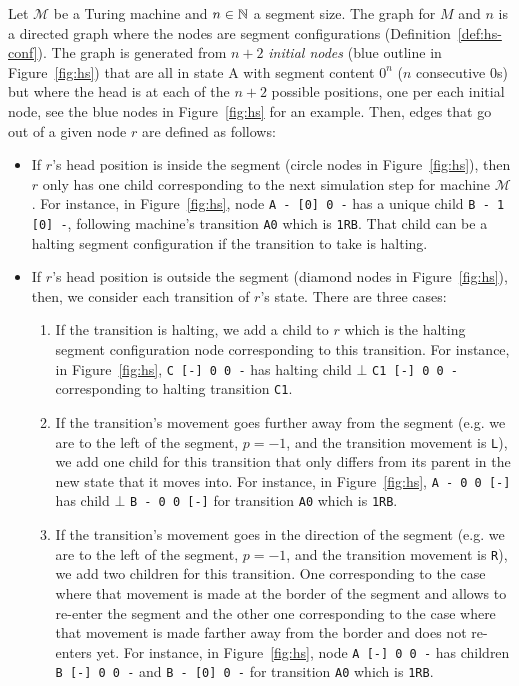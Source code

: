 \begin{definition}[\HS graph]\label{def:hs-graph}
  Let $\mathcal{M}$ be a Turing machine and $n \in \mathbb{N}$ a segment size. The \HS graph for $M$ and $n$ is a directed graph where the nodes are segment configurations (Definition~\ref{def:hs-conf}). The graph is generated from $n+2$ \textit{initial nodes} (blue outline in Figure~\ref{fig:hs}) that are all in state A with segment content $0^n$ ($n$ consecutive 0s) but where the head is at each of the $n+2$ possible positions, one per each initial node, see the blue nodes in Figure~\ref{fig:hs} for an example.
  Then, edges that go out of a given node $r$ are defined as follows:
  \begin{itemize}
    \item If $r$'s head position is inside the segment (circle nodes in Figure~\ref{fig:hs}), then $r$ only has one child corresponding to the next simulation step for machine $\mathcal{M}$. For instance, in Figure~\ref{fig:hs}, node \texttt{A - [0] 0 -} has a unique child \texttt{B - 1 [0] -}, following machine's transition \texttt{A0} which is \texttt{1RB}. That child can be a halting segment configuration if the transition to take is halting.
    \item If $r$'s head position is outside the segment (diamond nodes in Figure~\ref{fig:hs}), then, we consider each transition of $r$'s state. There are three cases:
          \begin{enumerate}
            \item If the transition is halting, we add a child to $r$ which is the halting segment configuration node corresponding to this transition. For instance, in Figure~\ref{fig:hs}, \texttt{C [-] 0 0 -} has halting child $\bot$ \texttt{C1 [-] 0 0 -} corresponding to halting transition \texttt{C1}.
            \item If the transition's movement goes further away from the segment (e.g. we are to the left of the segment, $p=-1$, and the transition movement is \texttt{L}), we add one child for this transition that only differs from its parent in the new state that it moves into. For instance, in Figure~\ref{fig:hs}, \texttt{A - 0 0 [-]} has child $\bot$ \texttt{B - 0 0 [-]} for transition \texttt{A0} which is \texttt{1RB}.
            \item If the transition's movement goes in the direction of the segment (e.g. we are to the left of the segment, $p=-1$, and the transition movement is \texttt{R}), we add two children for this transition. One corresponding to the case where that movement is made at the border of the segment and allows to re-enter the segment and the other one corresponding to the case where that movement is made farther away from the border and does not re-enters yet. For instance, in Figure~\ref{fig:hs}, node \texttt{A [-] 0 0 -} has children \texttt{B [-] 0 0 -} and \texttt{B - [0] 0 -} for transition \texttt{A0} which is \texttt{1RB}.
          \end{enumerate}
  \end{itemize}


\end{definition}
